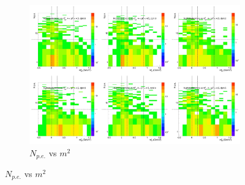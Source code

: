 \begin{figure}[H]
  \centering
    \begin{subfigure}{1\textwidth}
    \includegraphics[width=1\textwidth]{hiptfits/pos/PSaccthreshold_cent0_ich1_accfire0_ptbin14.jpg}
    \caption{$N_{p.e.}$ vs $m^2$}
    \end{subfigure}
\end{figure}
